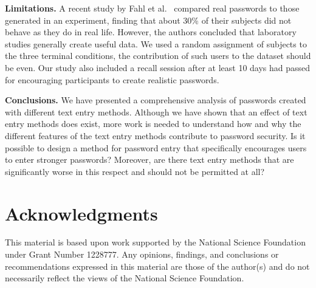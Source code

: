 \documentclass[conference]{IEEEtran}
\begin{document}
\textbf{Limitations.} A recent study by Fahl et al.~\cite{Fahl:2013:EVP:2501604.2501617} compared real passwords to those generated in an experiment, finding that about 30\% of their subjects did not behave as they do in real life. However, the authors concluded that laboratory studies generally create useful data. We used a random assignment of subjects to the three terminal conditions, the contribution of such users to the dataset should be even. Our study also included a recall session after at least 10 days had passed for encouraging participants to create realistic passwords.

\textbf{Conclusions.} 
We have presented a comprehensive analysis of passwords created with different text entry methods.
Although we have shown that an effect of text entry methods does exist, more work is needed to understand how and why the different features of the text entry methods contribute to password security. Is it possible to design a method for password entry that specifically encourages users to enter stronger passwords? Moreover, are there text entry methods that are significantly worse in this respect and should not be permitted at all?

\section*{Acknowledgments}

This material is based upon work supported by the National Science Foundation under Grant Number 1228777. Any opinions, findings, and conclusions or recommendations expressed in this material are those of the author(s) and do not necessarily reflect the views of the National Science Foundation.


\balance


\end{document}
